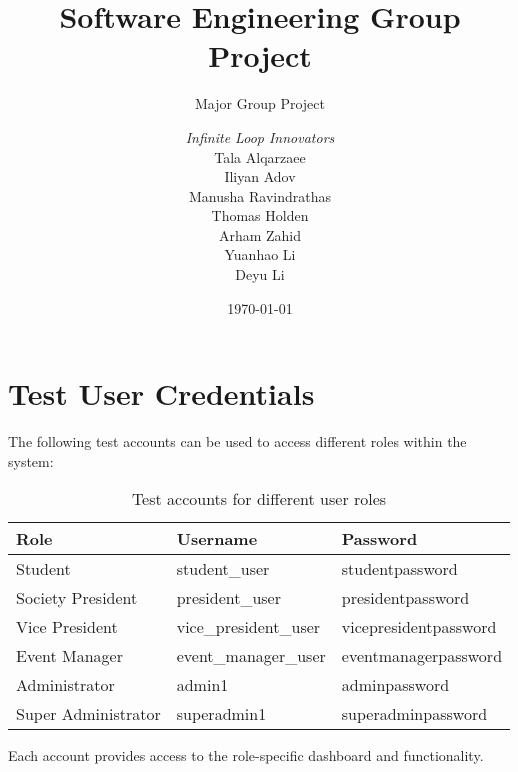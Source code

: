 \documentclass[a4paper, 12pt]{report}
\title{Software Engineering Group Project}
\subtitle{Major Group Project}%
\author{\textit{Infinite Loop Innovators}\\  %
    Tala Alqarzaee\\                        %
    Iliyan Adov\\                        %
    Manusha Ravindrathas\\                      %
    Thomas Holden\\                       %
    Arham Zahid\\                       %
    Yuanhao Li\\                        %
    Deyu Li\\                      %
}
\date{\today}
\begin{document}
    \maketitle
    \romantableofcontents

    
    
    
    
    
    

    \appendix
    \chapter{Test User Credentials}
    \label{app:credentials}
    
    The following test accounts can be used to access different roles within the system:
    
    \begin{table}[h]
    \centering
    \begin{tabular}{|l|l|l|}
    \hline
    \textbf{Role} & \textbf{Username} & \textbf{Password} \\
    \hline
    Student & student\_user & studentpassword \\
    \hline
    Society President & president\_user & presidentpassword \\
    \hline
    Vice President & vice\_president\_user & vicepresidentpassword \\
    \hline
    Event Manager & event\_manager\_user & eventmanagerpassword \\
    \hline
    Administrator & admin1 & adminpassword \\
    \hline
    Super Administrator & superadmin1 & superadminpassword \\
    \hline
    \end{tabular}
    \caption{Test accounts for different user roles}
    \label{tab:test-accounts}
    \end{table}
    
    Each account provides access to the role-specific dashboard and functionality.
\end{document}
